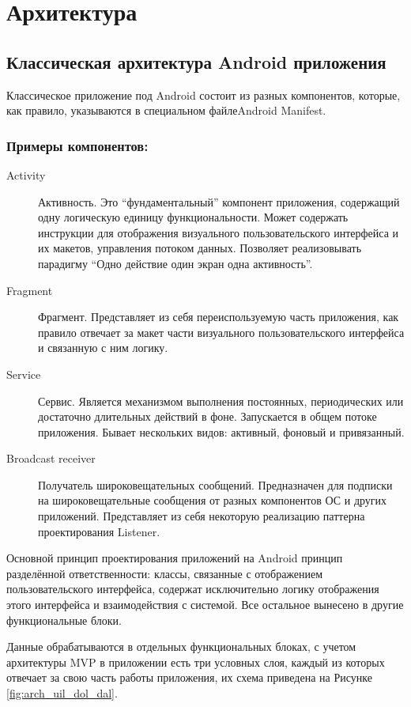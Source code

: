 \chapter{Архитектура}
\section{Классическая архитектура Android приложения}
Классическое приложение под Android состоит из разных компонентов, которые, как правило, указываются в специальном файле\textemdash\space Android Manifest.

\subsection*{Примеры компонентов:}
\begin{description}
	\item[Activity] Активность. Это ``фундаментальный'' компонент приложения, содержащий одну логическую единицу функциональности. Может содержать инструкции для отображения визуального пользовательского интерфейса и их макетов, управления потоком данных. Позволяет реализовывать парадигму ``Одно действие \textemdash\space один экран \textemdash\space одна активность''.
	\item[Fragment] Фрагмент. Представляет из себя переиспользуемую часть приложения, как правило отвечает за макет части визуального пользовательского интерфейса и связанную с ним логику.
	\item[Service] Сервис. Является механизмом выполнения постоянных, периодических или достаточно длительных действий в фоне. Запускается в общем потоке приложения. Бывает нескольких видов: активный, фоновый и привязанный.
	\item[Broadcast receiver] Получатель широковещательных сообщений. Предназначен для подписки на широковещательные сообщения от разных компонентов ОС и других приложений. Представляет из себя некоторую реализацию паттерна проектирования Listener.
\end{description}

Основной принцип проектирования приложений на Android \textemdash\space принцип разделённой ответственности: классы, связанные с отображением пользовательского интерфейса, содержат исключительно логику отображения этого интерфейса и взаимодействия с системой. Все остальное вынесено в другие функциональные блоки.

Данные обрабатываются в отдельных функциональных блоках, с учетом архитектуры MVP \textemdash\space в приложении есть три условных слоя, каждый из которых отвечает за свою часть работы приложения, их схема приведена на Рисунке \ref{fig:arch_uil_dol_dal}.

